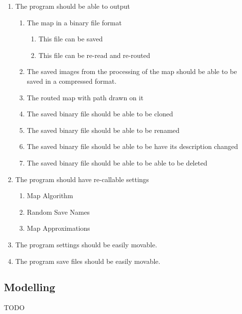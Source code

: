 \begin{flushleft}
        \begin{enumerate}[resume]
            \item The program should be able to output
            \begin{enumerate}
                \item The map in a binary file format
                \begin{enumerate}
                    \item This file can be saved
                    \item This file can be re-read and re-routed
                \end{enumerate}
                \item The saved images from the processing of the map should be able to be saved in a compressed format.
                \item The routed map with path drawn on it
                \item The saved binary file should be able to be cloned
                \item The saved binary file should be able to be renamed
                \item The saved binary file should be able to be have its description changed
                \item The saved binary file should be able to be able to be deleted                
            \end{enumerate}
            \item The program should have re-callable settings
            \begin{enumerate}
                \item Map Algorithm
                \item Random Save Names
                \item Map Approximations
            \end{enumerate}
            \item The program settings should be easily movable.
            \item The program save files should be easily movable.
        \end{enumerate}

        \bk

        \subsection{Modelling}
            TODO
        \bk

\end{flushleft}